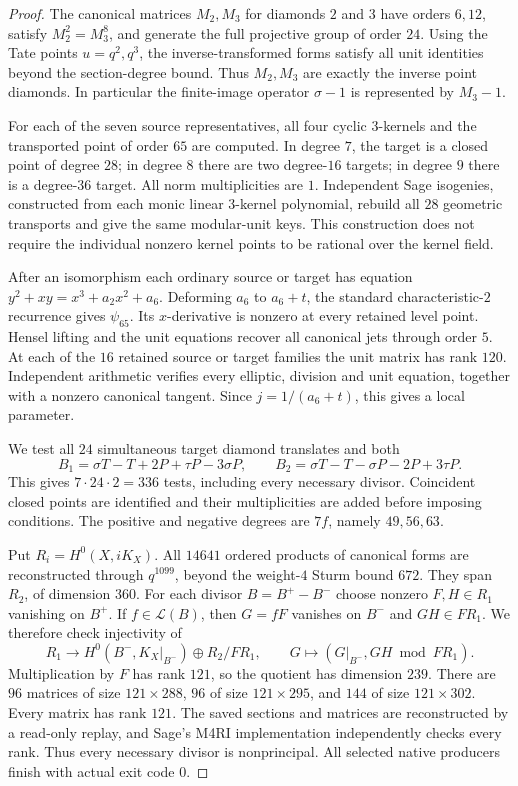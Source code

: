 \begin{proof}
The canonical matrices $M_2,M_3$ for diamonds $2$ and $3$ have orders $6,12$, satisfy $M_2^2=M_3^8$, and generate the full projective group of order $24$. Using the Tate points $u=q^2,q^3$, the inverse-transformed forms satisfy all unit identities beyond the section-degree bound. Thus $M_2,M_3$ are exactly the inverse point diamonds. In particular the finite-image operator $\sigma-1$ is represented by $M_3-1$.

For each of the seven source representatives, all four cyclic $3$-kernels and the transported point of order $65$ are computed. In degree $7$, the target is a closed point of degree $28$; in degree $8$ there are two degree-$16$ targets; in degree $9$ there is a degree-$36$ target. All norm multiplicities are $1$. Independent Sage isogenies, constructed from each monic linear $3$-kernel polynomial, rebuild all $28$ geometric transports and give the same modular-unit keys. This construction does not require the individual nonzero kernel points to be rational over the kernel field.

After an isomorphism each ordinary source or target has equation $y^2+xy=x^3+a_2x^2+a_6$. Deforming $a_6$ to $a_6+t$, the standard characteristic-$2$ recurrence gives $\psi_{65}$. Its $x$-derivative is nonzero at every retained level point. Hensel lifting and the unit equations recover all canonical jets through order $5$. At each of the $16$ retained source or target families the unit matrix has rank $120$. Independent arithmetic verifies every elliptic, division and unit equation, together with a nonzero canonical tangent. Since $j=1/(a_6+t)$, this gives a local parameter.

We test all $24$ simultaneous target diamond translates and both
\[
 B_1=\sigma T-T+2P+\tau P-3\sigma P,\qquad
 B_2=\sigma T-T-\sigma P-2P+3\tau P.
\]
This gives $7\cdot24\cdot2=336$ tests, including every necessary divisor. Coincident closed points are identified and their multiplicities are added before imposing conditions. The positive and negative degrees are $7f$, namely $49,56,63$.

Put $R_i=H^0(X,iK_X)$. All $14641$ ordered products of canonical forms are reconstructed through $q^{1099}$, beyond the weight-$4$ Sturm bound $672$. They span $R_2$, of dimension $360$. For each divisor $B=B^+-B^-$ choose nonzero $F,H\in R_1$ vanishing on $B^+$. If $f\in\mathcal L(B)$, then $G=fF$ vanishes on $B^-$ and $GH\in FR_1$. We therefore check injectivity of
\[
 R_1\longrightarrow H^0(B^-,K_X|_{B^-})\oplus R_2/FR_1,
 \qquad G\longmapsto(G|_{B^-},GH\bmod FR_1).
\]
Multiplication by $F$ has rank $121$, so the quotient has dimension $239$. There are $96$ matrices of size $121\times288$, $96$ of size $121\times295$, and $144$ of size $121\times302$. Every matrix has rank $121$. The saved sections and matrices are reconstructed by a read-only replay, and Sage's M4RI implementation independently checks every rank. Thus every necessary divisor is nonprincipal. All selected native producers finish with actual exit code $0$.
\end{proof}
